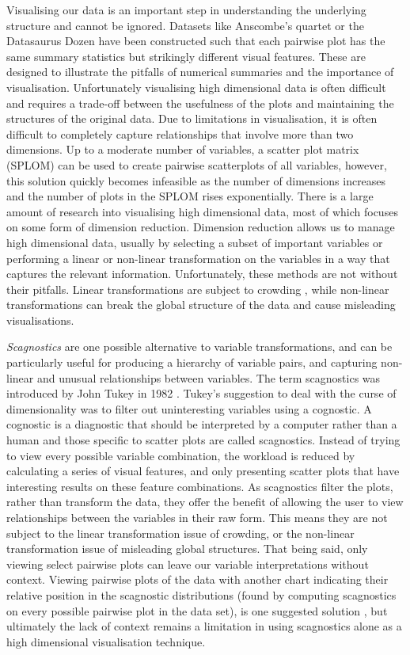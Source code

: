Visualising our data is an important step in understanding the underlying structure and cannot be ignored. Datasets like Anscombe's quartet \citep{anscombe} or the Datasaurus Dozen \citep{datasaurpkg} have been constructed such that each pairwise plot has the same summary statistics but strikingly different visual features. These are designed to illustrate the pitfalls of numerical summaries and the importance of visualisation. Unfortunately visualising high dimensional data is often difficult and requires a trade-off between the usefulness of the plots and maintaining the structures of the original data. Due to limitations in visualisation, it is often difficult to completely capture relationships that involve more than two dimensions. Up to a moderate number of variables, a scatter plot matrix (SPLOM) can be used to create pairwise scatterplots of all variables, however, this solution quickly becomes infeasible as the number of dimensions increases and the number of plots in the SPLOM rises exponentially. There is a large amount of research into visualising high dimensional data, most of which focuses on some form of dimension reduction. Dimension reduction allows us to manage high dimensional data, usually by selecting a subset of important variables or performing a linear or non-linear transformation on the variables in a way that captures the relevant information. Unfortunately, these methods are not without their pitfalls. Linear transformations are subject to crowding \citep{crowding}, while non-linear transformations can break the global structure of the data and cause misleading visualisations.

\emph{Scagnostics} are one possible alternative to variable transformations, and can be particularly useful for producing a hierarchy of variable pairs, and capturing non-linear and unusual relationships between variables. The term scagnostics was introduced by John Tukey in 1982 \citep{tukey}. Tukey's suggestion to deal with the curse of dimensionality was to filter out uninteresting variables using a cognostic. A cognostic is a diagnostic that should be interpreted by a computer rather than a human and those specific to scatter plots are called scagnostics. Instead of trying to view every possible variable combination, the workload is reduced by calculating a series of visual features, and only presenting scatter plots that have interesting results on these feature combinations. As scagnostics filter the plots, rather than transform the data, they offer the benefit of allowing the user to view relationships between the variables in their raw form. This means they are not subject to the linear transformation issue of crowding, or the non-linear transformation issue of misleading global structures. That being said, only viewing select pairwise plots can leave our variable interpretations without context. Viewing pairwise plots of the data with another chart indicating their relative position in the scagnostic distributions (found by computing scagnostics on every possible pairwise plot in the data set), is one suggested solution \citep{scagexplorer}, but ultimately the lack of context remains a limitation in using scagnostics alone as a high dimensional visualisation technique.


